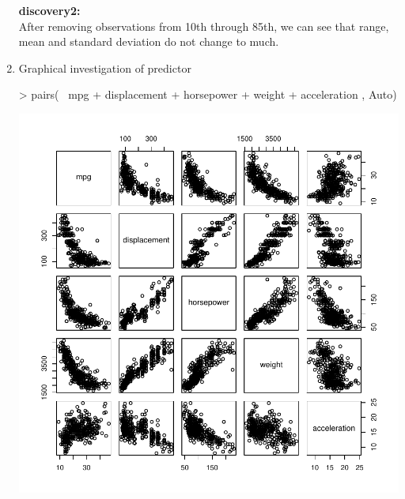 \documentclass[a4paper]{article}
\begin{document}
\begin{enumerate}
{
\colorbox{BurntOrange}{\textbf{discovery2:}}\color{red}\\
After removing observations from 10th through 85th, we can see that range, mean and standard deviation do not change to much.
}


\item Graphical investigation of predictor
\begin{Schunk}
\begin{Sinput}
> pairs( ~mpg + displacement + horsepower + weight + acceleration , Auto)
\end{Sinput}
\end{Schunk}
\includegraphics{introduction-pair}


\end{enumerate}
\end{document}
